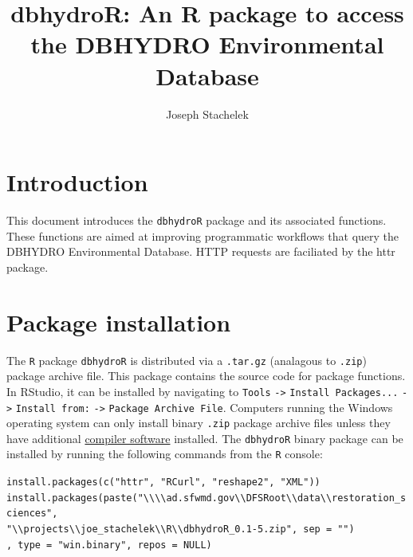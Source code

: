 \documentclass[12pt,notitlepage]{article}
\author{Joseph Stachelek}
\title{dbhydroR: An R package to access the DBHYDRO Environmental Database}
\begin{document}

\maketitle
 


\section{Introduction}

This document introduces the \texttt{dbhydroR} package and its associated functions. These functions are aimed at improving programmatic workflows that query the DBHYDRO Environmental Database. HTTP requests are faciliated by the httr \citep{httr} package. 

\section{Package installation}

The \texttt{R} package \texttt{dbhydroR} is distributed via a \texttt{.tar.gz} (analagous to \texttt{.zip}) package archive file. This package contains the source code for package functions. In RStudio, it can be installed by navigating to \texttt{Tools} \verb|->| \texttt{Install Packages...} \verb|->| \texttt{Install from:} \verb|->| \texttt{Package Archive File}. Computers running the Windows operating system can only install binary \texttt{.zip} package archive files unless they have additional \href{https://cran.r-project.org/bin/windows/Rtools/}{compiler software} installed. The \texttt{dbhydroR} binary package can be installed by running the following commands from the \texttt{R} console:

\vspace{10pt}
\noindent\texttt{install.packages(c("httr", "RCurl", "reshape2", "XML"))}\\
\noindent\texttt{install.packages(paste(}\verb|"\\\\ad.sfwmd.gov\\DFSRoot\\data\\restoration_sciences",|\\
\verb|"\\projects\\joe_stachelek\\R\\dbhydroR_0.1-5.zip", sep = "")|\\
\texttt{, type = "win.binary", repos = NULL)}
\end{document}
